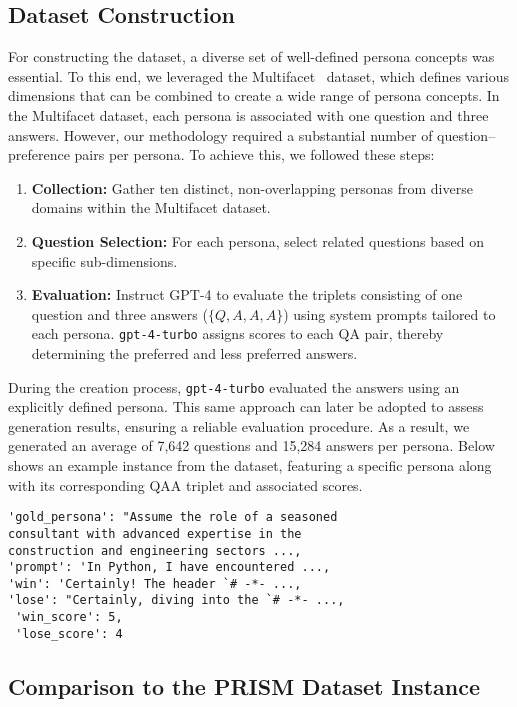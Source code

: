 \subsection{Dataset Construction}

For constructing the dataset, a diverse set of well-defined persona concepts was essential. To this end, we leveraged the Multifacet~\citep{multifacet} dataset, which defines various dimensions that can be combined to create a wide range of persona concepts. In the Multifacet dataset, each persona is associated with one question and three answers. However, our methodology required a substantial number of question–preference pairs per persona. To achieve this, we followed these steps:
\begin{enumerate}
    \item \textbf{Collection:} Gather ten distinct, non-overlapping personas from diverse domains within the Multifacet dataset.
    \item \textbf{Question Selection:} For each persona, select related questions based on specific sub-dimensions.
    \item \textbf{Evaluation:} Instruct GPT-4 to evaluate the triplets consisting of one question and three answers (\(\{Q, A, A, A\}\)) using system prompts tailored to each persona. \texttt{gpt-4-turbo} assigns scores to each QA pair, thereby determining the preferred and less preferred answers.
\end{enumerate}
\noindent
During the creation process, \texttt{gpt-4-turbo} evaluated the answers using an explicitly defined persona. This same approach can later be adopted to assess generation results, ensuring a reliable evaluation procedure. As a result, we generated an average of 7,642 questions and 15,284 answers per persona. Below shows an example instance from the dataset, featuring a specific persona along with its corresponding QAA triplet and associated scores.

\begin{Verbatim}[fontsize=\small]
'gold_persona': "Assume the role of a seasoned
consultant with advanced expertise in the 
construction and engineering sectors ...,
'prompt': 'In Python, I have encountered ...,
'win': 'Certainly! The header `# -*- ...,
'lose': "Certainly, diving into the `# -*- ...,
 'win_score': 5,
 'lose_score': 4
\end{Verbatim}


\subsection{Comparison to the PRISM Dataset Instance}

